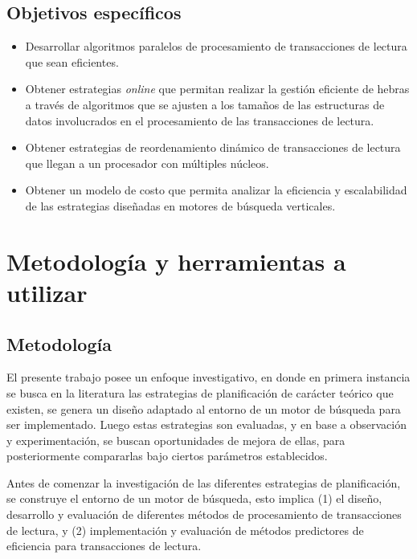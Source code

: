 \subsection{Objetivos específicos}
\label{intro:objetivosespecificos}
\begin{itemize}	
	\item Desarrollar algoritmos paralelos de procesamiento de transacciones de lectura que sean eficientes.
	
	\item Obtener estrategias \textit{online} que permitan realizar la gestión eficiente de hebras a través de algoritmos que se ajusten a los tamaños de las estructuras de datos involucrados en el procesamiento de las transacciones de lectura.
    
    \item Obtener estrategias de reordenamiento dinámico de transacciones de lectura que llegan a un procesador con múltiples núcleos.
    
    \item Obtener un modelo de costo que permita analizar la eficiencia y escalabilidad de las estrategias diseñadas en motores de búsqueda verticales.
\end{itemize}

\section{Metodología y herramientas a utilizar}
\label{intro:metodologiayherramientas}

\subsection{Metodología}
\label{intro:metodologia}
El presente trabajo posee un enfoque investigativo, en donde en primera instancia se busca en la literatura las estrategias de planificación de carácter teórico que existen, se genera un diseño adaptado al entorno de un motor de búsqueda para ser implementado. Luego estas estrategias son evaluadas, y en base a observación y experimentación, se buscan oportunidades de mejora de ellas, para posteriormente compararlas bajo ciertos parámetros establecidos.

Antes de comenzar la investigación de las diferentes estrategias de planificación, se construye el entorno de un motor de búsqueda, esto implica (1) el diseño, desarrollo y evaluación de diferentes métodos de procesamiento de transacciones de lectura, y (2) implementación y evaluación de métodos predictores de eficiencia para transacciones de lectura.

